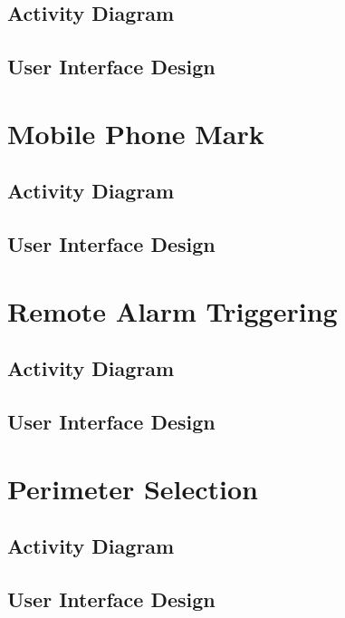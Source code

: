 \subsection{Activity Diagram}

\newpage
\subsection{User Interface Design}

\section{Mobile Phone Mark}

\newpage
\subsection{Activity Diagram}

\newpage
\subsection{User Interface Design}

\section{Remote Alarm Triggering}

\newpage
\subsection{Activity Diagram}

\newpage
\subsection{User Interface Design}

\section{Perimeter Selection}

\newpage
\subsection{Activity Diagram}

\newpage
\subsection{User Interface Design}
